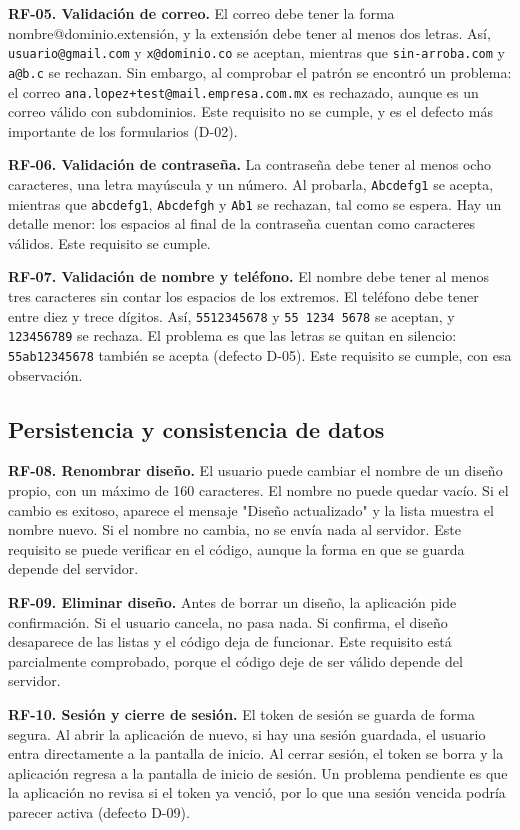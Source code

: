\documentclass[11pt,a4paper]{article}
\begin{document}
\textbf{RF-05. Validación de correo.} El correo debe tener la forma nombre@dominio.extensión, y la extensión debe tener al menos dos letras. Así, \texttt{usuario@gmail.com} y \texttt{x@dominio.co} se aceptan, mientras que \texttt{sin-arroba.com} y \texttt{a@b.c} se rechazan. Sin embargo, al comprobar el patrón se encontró un problema: el correo \texttt{ana.lopez+test@mail.empresa.com.mx} es rechazado, aunque es un correo válido con subdominios. Este requisito no se cumple, y es el defecto más importante de los formularios (D-02).

\textbf{RF-06. Validación de contraseña.} La contraseña debe tener al menos ocho caracteres, una letra mayúscula y un número. Al probarla, \texttt{Abcdefg1} se acepta, mientras que \texttt{abcdefg1}, \texttt{Abcdefgh} y \texttt{Ab1} se rechazan, tal como se espera. Hay un detalle menor: los espacios al final de la contraseña cuentan como caracteres válidos. Este requisito se cumple.

\textbf{RF-07. Validación de nombre y teléfono.} El nombre debe tener al menos tres caracteres sin contar los espacios de los extremos. El teléfono debe tener entre diez y trece dígitos. Así, \texttt{5512345678} y \texttt{55 1234 5678} se aceptan, y \texttt{123456789} se rechaza. El problema es que las letras se quitan en silencio: \texttt{55ab12345678} también se acepta (defecto D-05). Este requisito se cumple, con esa observación.

\subsection*{Persistencia y consistencia de datos}

\textbf{RF-08. Renombrar diseño.} El usuario puede cambiar el nombre de un diseño propio, con un máximo de 160 caracteres. El nombre no puede quedar vacío. Si el cambio es exitoso, aparece el mensaje "Diseño actualizado" y la lista muestra el nombre nuevo. Si el nombre no cambia, no se envía nada al servidor. Este requisito se puede verificar en el código, aunque la forma en que se guarda depende del servidor.

\textbf{RF-09. Eliminar diseño.} Antes de borrar un diseño, la aplicación pide confirmación. Si el usuario cancela, no pasa nada. Si confirma, el diseño desaparece de las listas y el código deja de funcionar. Este requisito está parcialmente comprobado, porque el código deje de ser válido depende del servidor.

\textbf{RF-10. Sesión y cierre de sesión.} El token de sesión se guarda de forma segura. Al abrir la aplicación de nuevo, si hay una sesión guardada, el usuario entra directamente a la pantalla de inicio. Al cerrar sesión, el token se borra y la aplicación regresa a la pantalla de inicio de sesión. Un problema pendiente es que la aplicación no revisa si el token ya venció, por lo que una sesión vencida podría parecer activa (defecto D-09).
\end{document}
